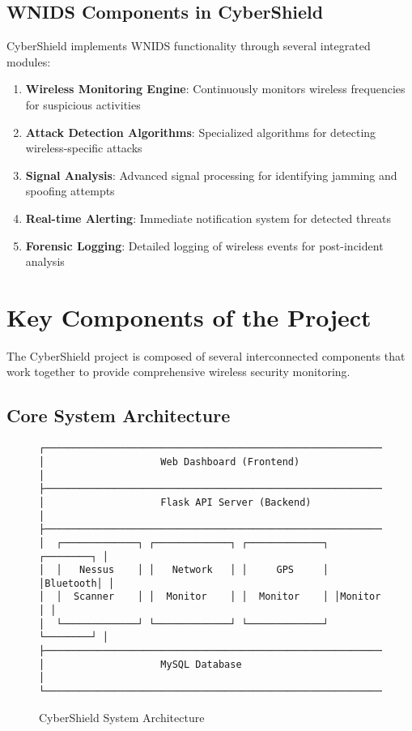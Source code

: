 \documentclass[12pt,a4paper]{report}
\begin{document}
\subsection{WNIDS Components in CyberShield}

CyberShield implements WNIDS functionality through several integrated modules:

\begin{enumerate}
    \item \textbf{Wireless Monitoring Engine}: Continuously monitors wireless frequencies for suspicious activities
    \item \textbf{Attack Detection Algorithms}: Specialized algorithms for detecting wireless-specific attacks
    \item \textbf{Signal Analysis}: Advanced signal processing for identifying jamming and spoofing attempts
    \item \textbf{Real-time Alerting}: Immediate notification system for detected threats
    \item \textbf{Forensic Logging}: Detailed logging of wireless events for post-incident analysis
\end{enumerate}

\section{Key Components of the Project}

The CyberShield project is composed of several interconnected components that work together to provide comprehensive wireless security monitoring.

\subsection{Core System Architecture}

\begin{figure}[H]
\centering
\begin{verbatim}
┌─────────────────────────────────────────────────────────────┐
│                    Web Dashboard (Frontend)                 │
├─────────────────────────────────────────────────────────────┤
│                    Flask API Server (Backend)              │
├─────────────────────────────────────────────────────────────┤
│  ┌─────────────┐ ┌─────────────┐ ┌─────────────┐ ┌────────┐ │
│  │   Nessus    │ │   Network   │ │     GPS     │ │Bluetooth│ │
│  │  Scanner    │ │  Monitor    │ │  Monitor    │ │Monitor │ │
│  └─────────────┘ └─────────────┘ └─────────────┘ └────────┘ │
├─────────────────────────────────────────────────────────────┤
│                    MySQL Database                          │
└─────────────────────────────────────────────────────────────┘
\end{verbatim}
\caption{CyberShield System Architecture}
\label{fig:system_architecture}
\end{figure}
\end{document}
